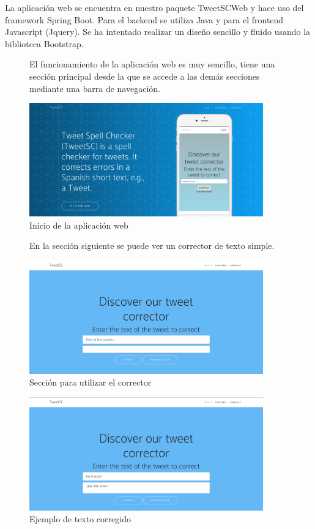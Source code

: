 \documentclass[spanish,12pt, a4paper,twoside]{paper}
\begin{document}
La aplicación web se encuentra en nuestro paquete TweetSCWeb y hace uso del framework Spring Boot. Para el backend se utiliza Java y para el frontend Javascript (Jquery). Se ha intentado realizar un diseño sencillo y fluido usando la biblioteca Bootstrap.\\

\begin{figure}[h]
El funcionamiento de la aplicación web es muy sencillo, tiene una sección principal desde la que se accede a las demás secciones mediante una barra de navegación.
\begin{center}
 \includegraphics[width=0.9\textwidth]{recursos/WebInicio.png}
\caption{Inicio de la aplicación web}
\label{fig:webinicio}
\end{center}
\end{figure}

\begin{figure}[h]
En la sección siguiente se puede ver un corrector de texto simple.
\begin{center}
\includegraphics[width=0.9\textwidth]{recursos/WebUseIt.png}
\caption{Sección para utilizar el corrector}
\label{fig:webuseit}
\end{center}
\end{figure}

\begin{figure}[h]
\centering
 \includegraphics[width=0.9\textwidth]{recursos/WebUseIt_Corrected.png}
\caption{Ejemplo de texto corregido}
\label{fig:webuseitcorrected}
\end{figure}
\end{document}
